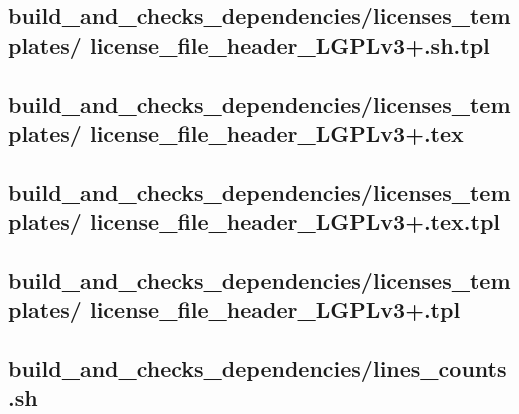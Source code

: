\documentclass{article}
\begin{document}


\subsection{
  build\_and\_checks\_dependencies/licenses\_templates/%
license\_file\_header\_LGPLv3+.sh.tpl
}
\label{
  build_and_checks_dependencies:licenses_templates:%
license_file_header_LGPLv3+shtpl
}



\subsection{
  build\_and\_checks\_dependencies/licenses\_templates/%
license\_file\_header\_LGPLv3+.tex
}
\label{
  build_and_checks_dependencies:licenses_templates:%
license_file_header_LGPLv3+tex
}



\subsection{
  build\_and\_checks\_dependencies/licenses\_templates/%
license\_file\_header\_LGPLv3+.tex.tpl
}
\label{
  build_and_checks_dependencies:licenses_templates:%
license_file_header_LGPLv3+textpl
}



\subsection{
  build\_and\_checks\_dependencies/licenses\_templates/%
license\_file\_header\_LGPLv3+.tpl
}
\label{
  build_and_checks_dependencies:licenses_templates:%
license_file_header_LGPLv3+tpl
}



\subsection{
  build\_and\_checks\_dependencies/lines\_counts.sh
}
\label{
  build_and_checks_dependencies:lines_countssh
}
\end{document}
